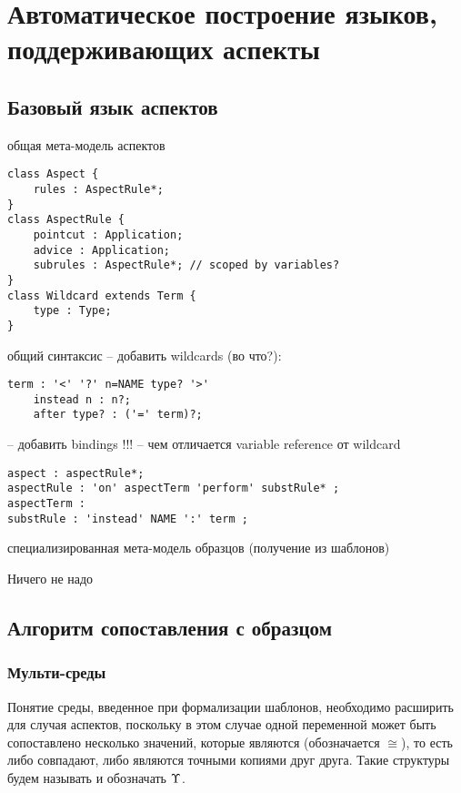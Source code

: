 \chapter{Автоматическое построение языков, поддерживающих аспекты}

\section{Базовый язык аспектов}
общая мета-модель аспектов

\begin{lstlisting}
class Aspect {
	rules : AspectRule*;
}
class AspectRule {
	pointcut : Application;
	advice : Application;
	subrules : AspectRule*; // scoped by variables?
}
class Wildcard extends Term {
	type : Type;
}
\end{lstlisting}

общий синтаксис
 -- добавить wildcards (во что?):
\begin{lstlisting}
term : '<' '?' n=NAME type? '>'
	instead n : n?;
	after type? : ('=' term)?;
\end{lstlisting}

 -- добавить bindings !!! 
 -- чем отличается variable reference от wildcard
\begin{lstlisting}
aspect : aspectRule*;
aspectRule : 'on' aspectTerm 'perform' substRule* ;
aspectTerm : 
substRule : 'instead' NAME ':' term ;
\end{lstlisting}

специализированная мета-модель образцов (получение из шаблонов)

   Ничего не надо

\section{Алгоритм сопоставления с образцом}

\subsection{Мульти-среды}

Понятие среды, введенное при формализации шаблонов, необходимо расширить для случая аспектов, поскольку в этом случае одной переменной может быть сопоставлено несколько значений, которые являются  (обозначается $\cong$), то есть либо совпадают, либо являются точными копиями друг друга. Такие структуры будем называть  и обозначать $\Upsilon$.

